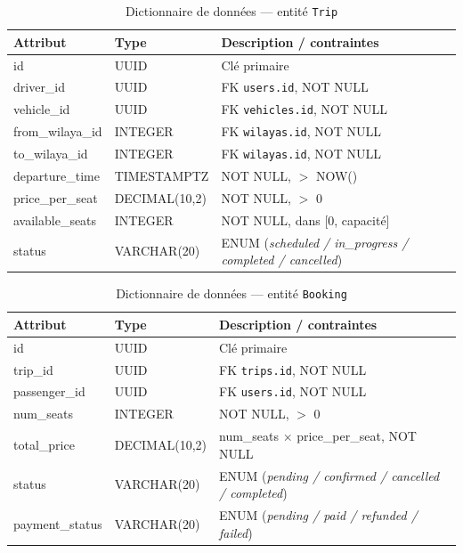 \documentclass[12pt, a4paper, oneside]{report}
\begin{document}
\begin{table}[H]
\centering
\footnotesize
\begin{tabularx}{\textwidth}{|l|l|X|}
\hline
\rowcolor{rohlight}
\textbf{Attribut} & \textbf{Type} & \textbf{Description / contraintes} \\
\hline
id & UUID & Clé primaire \\
\hline
driver\_id & UUID & FK \texttt{users.id}, NOT NULL \\
\hline
vehicle\_id & UUID & FK \texttt{vehicles.id}, NOT NULL \\
\hline
from\_wilaya\_id & INTEGER & FK \texttt{wilayas.id}, NOT NULL \\
\hline
to\_wilaya\_id & INTEGER & FK \texttt{wilayas.id}, NOT NULL \\
\hline
departure\_time & TIMESTAMPTZ & NOT NULL, $>$ NOW() \\
\hline
price\_per\_seat & DECIMAL(10,2) & NOT NULL, $>$ 0 \\
\hline
available\_seats & INTEGER & NOT NULL, dans [0, capacité] \\
\hline
status & VARCHAR(20) & ENUM (\textit{scheduled / in\_progress / completed / cancelled}) \\
\hline
\end{tabularx}
  \caption{Dictionnaire de données --- entité \texttt{Trip}}
  \label{tab:dict-trip}
\end{table}

\begin{table}[H]
\centering
\footnotesize
\begin{tabularx}{\textwidth}{|l|l|X|}
\hline
\rowcolor{rohlight}
\textbf{Attribut} & \textbf{Type} & \textbf{Description / contraintes} \\
\hline
id & UUID & Clé primaire \\
\hline
trip\_id & UUID & FK \texttt{trips.id}, NOT NULL \\
\hline
passenger\_id & UUID & FK \texttt{users.id}, NOT NULL \\
\hline
num\_seats & INTEGER & NOT NULL, $>$ 0 \\
\hline
total\_price & DECIMAL(10,2) & num\_seats $\times$ price\_per\_seat, NOT NULL \\
\hline
status & VARCHAR(20) & ENUM (\textit{pending / confirmed / cancelled / completed}) \\
\hline
payment\_status & VARCHAR(20) & ENUM (\textit{pending / paid / refunded / failed}) \\
\hline
\end{tabularx}
  \caption{Dictionnaire de données --- entité \texttt{Booking}}
  \label{tab:dict-booking}
\end{table}
\end{document}
